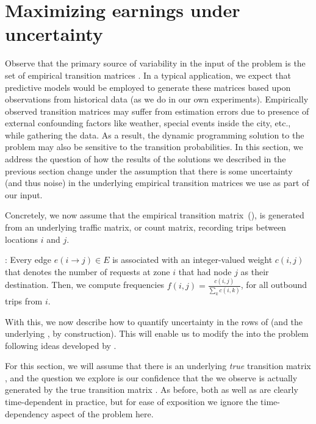 

\section{Maximizing earnings under uncertainty}
\label{sec:sensitivity}
Observe that the primary source of variability in the input of the {\originalproblem} problem
is the set of empirical transition matrices {\empiricaltransitionmatrix}.  In a typical application,
we expect that predictive models would be employed to generate these matrices based upon observations
from historical data (as we do in our own experiments).  Empirically observed transition matrices may 
suffer from estimation errors due to presence of external confounding factors like weather, special 
events inside the city, etc., while gathering the data. As a result, the dynamic programming solution 
to the {\originalproblem} problem may also be sensitive to the transition probabilities. In this section, 
we address the question of how the results of the solutions we described in the previous section change 
under the assumption that there is some uncertainty (and thus noise) in the underlying empirical transition 
matrices we use as part of our input.

Concretely, we now assume that the empirical transition matrix~(\empiricaltransitionmatrix),  is generated from an 
underlying traffic matrix, or count matrix, recording trips between locations $i$ and $j$.

:
Every edge $e(i\rightarrow j) \in E$ is associated with an
integer-valued weight $c(i,j)$ that denotes the number of requests
at zone $i$ that had node $j$ as their destination.
Then, we compute frequencies $f(i,j) = \frac{c(i,j)}{\sum_k c(i,k)}$, for all outbound trips from $i$.




With this, we now describe how to quantify uncertainty in the rows of {\empiricaltransitionmatrix} 
(and the underlying {\countmatrix}, by construction). This will enable us to  
modify the {\originalproblem} into the {\robustproblem} problem following ideas developed
by \citet{nilim2004robustness}.



For this section, we will assume that there is an underlying \emph{true} transition matrix
{\truetransitionmatrix}, and the question we explore is 
our confidence that the
{\countmatrix} we observe is actually 
generated by the true transition matrix {\truetransitionmatrix}.  As before, both 
{\truetransitionmatrix} as well as {\countmatrix} are clearly time-dependent in practice,
but for ease of exposition we ignore the time-dependency aspect of the problem here.

